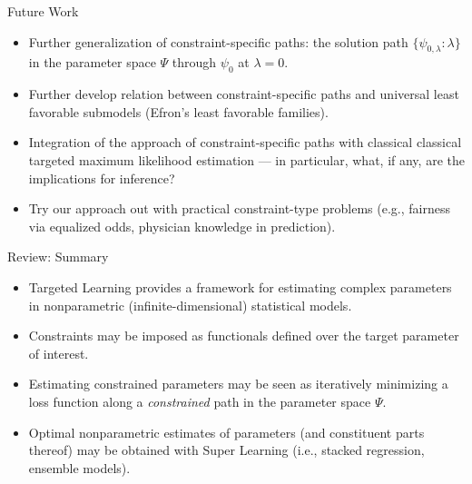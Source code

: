 \documentclass[12pt,t,handout]{beamer}
\begin{document}
\begin{frame}[c]{Future Work}

\begin{center}
\begin{itemize}
  \itemsep12pt
  \item Further generalization of constraint-specific paths: the solution path
    $\{\psi_{0, \lambda}: \lambda\}$ in the parameter space $\Psi$ through
    $\psi_0$ at $\lambda = 0$.
  \item Further develop relation between constraint-specific paths and universal
    least favorable submodels (Efron's least favorable families).
  \item Integration of the approach of constraint-specific paths with classical
    classical targeted maximum likelihood estimation --- in particular, what, if
    any, are the implications for inference?
  \item Try our approach out with practical constraint-type problems (e.g.,
    fairness via equalized odds, physician knowledge in prediction).
\end{itemize}
\end{center}

\note{
}

\end{frame}


\begin{frame}[c]{Review: Summary}

\begin{center}
\begin{itemize}
  \itemsep12pt
  \item Targeted Learning provides a framework for estimating complex parameters
    in nonparametric (infinite-dimensional) statistical models.
  \item Constraints may be imposed as functionals defined over the target
    parameter of interest.
  \item Estimating constrained parameters may be seen as iteratively minimizing
    a loss function along a \textit{constrained} path in the parameter space
    $\Psi$.
  \item Optimal nonparametric estimates of parameters (and constituent parts
    thereof) may be obtained with Super Learning (i.e., stacked regression,
    ensemble models).
\end{itemize}
\end{center}


\end{frame}
\end{document}

